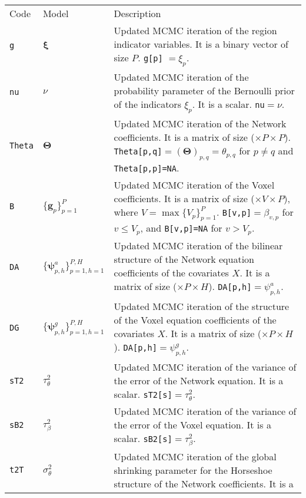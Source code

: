 \documentclass[
]{article}
\begin{document}
\begin{longtable}[]{@{}
  >{\raggedright\arraybackslash}p{}
  >{\raggedright\arraybackslash}p{}
  >{\raggedright\arraybackslash}p{}@{}}
\toprule\noalign{}
\endhead
\bottomrule\noalign{}
\endlastfoot
Code & Model & Description \\
\texttt{g} & \( {\boldsymbol \xi} \) & Updated MCMC iteration of the region indicator variables. It is a binary
vector of size \(P\). \texttt{g{[}p{]}} \(={\xi_p}\). \\
\texttt{nu} & \(\nu\) & Updated MCMC iteration of the probability parameter of the Bernoulli prior of the indicators \(\xi_p\). It is a scalar.
\texttt{nu}\(=\nu\). \\
\texttt{Theta} & \( {\boldsymbol \Theta} \) & Updated MCMC iteration of the Network coefficients. It is a matrix of size (\(\times P \times P\)).
\texttt{Theta{[}p,q{]}}\(=( {\boldsymbol \Theta} )_{p,q}=\theta_{p,q}\) for \(p\neq q\) and \texttt{Theta{[}p,p{]}=NA}. \\
\texttt{B} & \(\{ {\boldsymbol g} _p\}_{p=1}^P\) & Updated MCMC iteration of the Voxel coefficients. It is a matrix of size (\(\times V \times P\)), where \(V=\max\{V_p\}_{p=1}^P\).
\texttt{B{[}v,p{]}}\(=\beta_{v,p}\) for \(v \leq V_p\), and \texttt{B{[}v,p{]}=NA} for \(v > V_p\). \\
\texttt{DA} & \(\{ {\boldsymbol \psi} _{p,h}^a\}_{p=1,h=1}^{P,H}\) & Updated MCMC iteration of the bilinear structure of the Network equation coefficients of the covariates \(X\). It is a matrix of
size (\(\times P \times H\)). \texttt{DA{[}p,h{]}}\(= {\psi_{p,h}^{a}}\). \\
\texttt{DG} & \(\{ {\boldsymbol \psi} _{p,h}^g\}_{p=1,h=1}^{P,H}\) & Updated MCMC iteration of the structure of the Voxel equation coefficients of the covariates \(X\). It is a matrix of size
(\(\times P \times H\)). \texttt{DA{[}p,h{]}}\(= {\psi_{p,h}^{g}}\). \\
\texttt{sT2} & \(\tau^2_\theta\) & Updated MCMC iteration of the variance of the error of the Network equation. It is a scalar. \texttt{sT2{[}s{]}}\(= {\tau^2_\theta}\). \\
\texttt{sB2} & \(\tau^2_\beta\) & Updated MCMC iteration of the variance of the error of the Voxel equation. It is a scalar. \texttt{sB2{[}s{]}}\(= {\tau^2_\beta}\). \\
\texttt{t2T} & \(\sigma_\theta^2\) & Updated MCMC iteration of the global shrinking parameter for the Horseshoe structure of the Network coefficients. It is a

\end{longtable}
\end{document}
